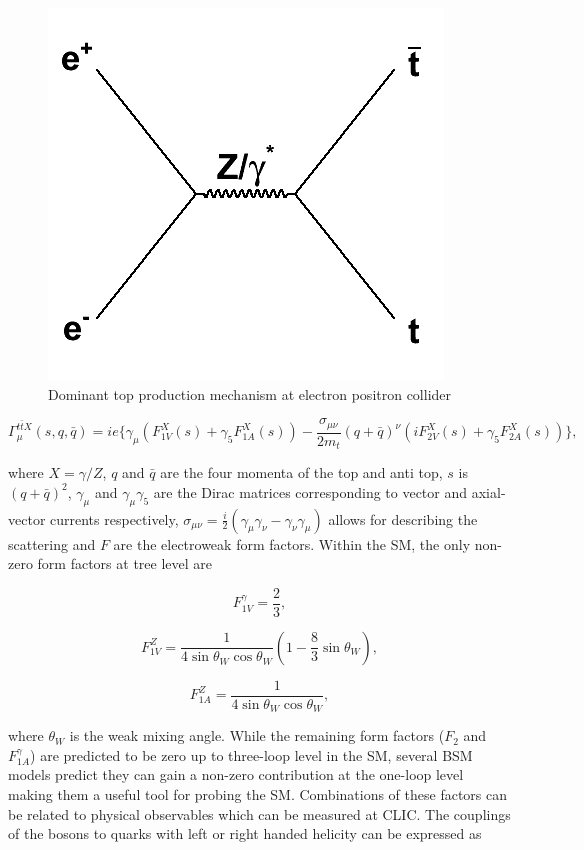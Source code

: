 \begin{figure}
\centering
\includegraphics[width=0.35\linewidth]{Theory/fig/ttFeynmann}
\caption[Dominant top production mechanism at electron positron colliders]{Dominant top production mechanism at electron positron collider}
\label{fig:topFeynmann}
\end{figure}

\begin{equation}
\Gamma_{\mu}^{t\bar{t}X}(s,q,\bar{q})= ie\{ \gamma_{\mu}(F_{1V}^{X}(s)+ \gamma_{5}F_{1A}^{X}(s)) - \frac{\sigma_{\mu\nu}}{2m_t}(q+\bar{q})^{\nu}(iF_{2V}^{X}(s) + \gamma_{5}F_{2A}^{X}(s))\},
\end{equation}

where $X=\gamma /Z$, $q$ and $\bar{q}$ are the four momenta of the top and anti top, $s$ is $(q+\bar{q})^2$, $\gamma_\mu$ and $\gamma_\mu\gamma_5$ are the Dirac matrices corresponding to vector and axial-vector currents respectively, $\sigma_{\mu\nu}=\frac{i}{2}(\gamma_\mu \gamma_\nu -\gamma_\nu \gamma_\mu)$ allows for describing the scattering and $F$ are the electroweak form factors. Within the \ac{SM}, the only non-zero form factors at tree level are

\begin{equation}
F_{1V}^{\gamma}=\frac{2}{3},
\end{equation}

\begin{equation}
F_{1V}^{Z}=\frac{1}{4\sin\theta_{W}\cos\theta_{W}}(1-\frac{8}{3}\sin\theta_{W}),
\end{equation}

\begin{equation}
F_{1A}^{Z}=\frac{1}{4\sin\theta_{W}\cos\theta_{W}},
\end{equation}

where $\theta_W$ is the weak mixing angle. While the remaining form factors ($F_2$ and $F_{1A}^{\gamma}$) are predicted to be zero up to three-loop level in the \ac{SM}, several \ac{BSM} models predict they can gain a non-zero contribution at the one-loop level\cite{Abe:2001swa} making them a useful tool for probing the \ac{SM}. Combinations of these factors can be related to physical observables which can be measured at CLIC. The couplings of the bosons to quarks with left or right handed helicity can be expressed as

